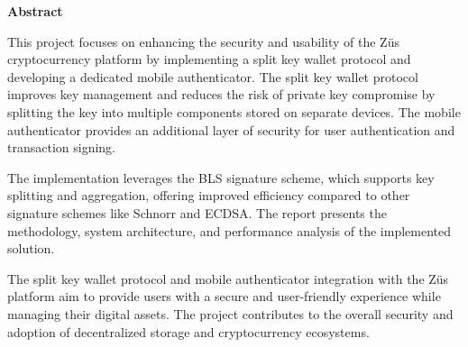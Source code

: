 
\begin{center}
    \Large \textbf{Abstract}
\end{center}

This project focuses on enhancing the security and usability of the Züs cryptocurrency platform by implementing a split key wallet protocol and developing a dedicated mobile authenticator. The split key wallet protocol improves key management and reduces the risk of private key compromise by splitting the key into multiple components stored on separate devices. The mobile authenticator provides an additional layer of security for user authentication and transaction signing.

The implementation leverages the BLS signature scheme, which supports key splitting and aggregation, offering improved efficiency compared to other signature schemes like Schnorr and ECDSA. The report presents the methodology, system architecture, and performance analysis of the implemented solution.

The split key wallet protocol and mobile authenticator integration with the Züs platform aim to provide users with a secure and user-friendly experience while managing their digital assets. The project contributes to the overall security and adoption of decentralized storage and cryptocurrency ecosystems.
